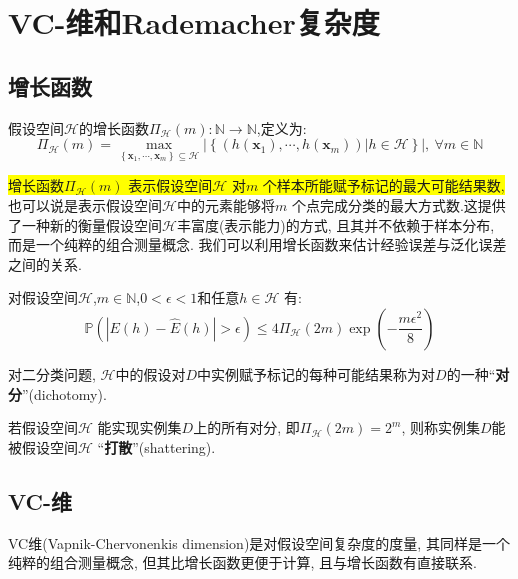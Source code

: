 \section{VC-维和Rademacher复杂度}
\subsection{增长函数}
\noindent
\begin{definition}[增长函数]
假设空间$\mathcal{H}$的增长函数$\Pi _{\mathcal{H}}\left( m \right) : \mathbb{N}\rightarrow\mathbb{N} $,定义为:
\begin{equation}
\Pi _{\mathcal{H}}\left( m \right) =\max_{\left\{ \mathbf{x}_1,\cdots ,\mathbf{x}_m \right\} \subseteq \mathcal{H}}\left| \left\{ \left( h\left( \mathbf{x}_1 \right) ,\cdots ,h\left( \mathbf{x}_m \right) \right) \left| h\in \mathcal{H} \right. \right\} \right|,\ \forall m\in \mathbb{N}
\end{equation}
\end{definition}

\colorbox{yellow}{增长函数$\Pi _{\mathcal{H}}\left( m \right)$ 表示假设空间$\mathcal{H}$ 对$m$ 个样本所能赋予标记的最大可能结果数,} 也可以说是表示假设空间$\mathcal{H}$中的元素能够将$m$ 个点完成分类的最大方式数.这提供了一种新的衡量假设空间$\mathcal{H}$丰富度(表示能力)的方式, 且其并不依赖于样本分布, 而是一个纯粹的组合测量概念. 我们可以利用增长函数来估计经验误差与泛化误差之间的关系. \\
\begin{theorem}
对假设空间$\mathcal{H}$,$m\in \mathbb{N}$,$0<\epsilon<1$和任意$h\in\mathcal{H}$ 有:
\begin{equation}
\mathbb{P}\left( \left| E\left( h \right) -\hat{E}\left( h \right) \right|>\epsilon \right) \le 4\Pi _{\mathcal{H}}\left( 2m \right) \exp \left( -\frac{m\epsilon ^2}{8} \right)
\end{equation}
\end{theorem}

对二分类问题, $\mathcal{H}$中的假设对$D$中实例赋予标记的每种可能结果称为对$D$的一种“\textbf{对分}”(dichotomy).

若假设空间$\mathcal{H}$ 能实现实例集$D$上的所有对分, 即$\Pi _{\mathcal{H}}\left( 2m \right) = 2^m$, 则称实例集$D$能被假设空间$\mathcal{H}$ “\textbf{打散}”(shattering).

\subsection{VC-维}
VC维(Vapnik-Chervonenkis dimension)是对假设空间复杂度的度量, 其同样是一个纯粹的组合测量概念, 但其比增长函数更便于计算, 且与增长函数有直接联系. \\

